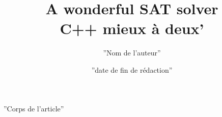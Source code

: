 \documentclass[a4paper, 11pt]{article}
\begin{document}
\title{A wonderful SAT solver\\C++ mieux \`a deux'}
\author{''Nom de l'auteur''}
\date{''date de fin de rédaction''} 

\maketitle

\tableofcontents

''Corps de l'article''
\end{document}
